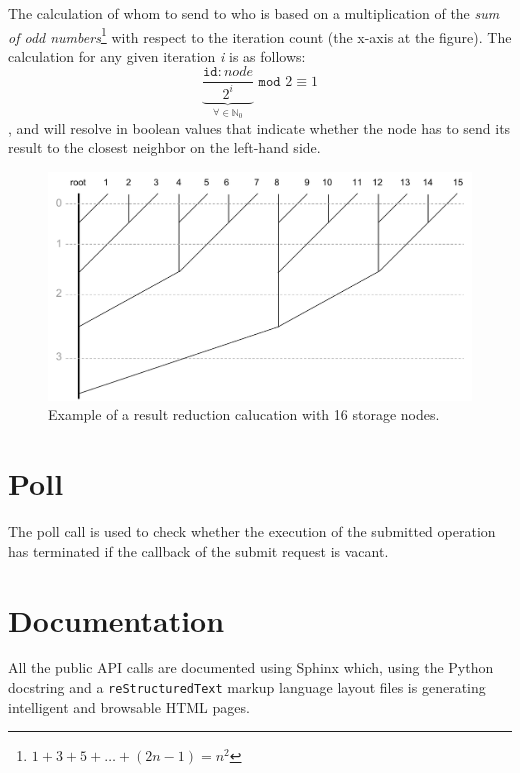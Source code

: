 The calculation of whom to send to who is based on a multiplication of the \textit{sum of odd numbers}\footnote{$1 + 3 + 5 + \ldots + (2n-1) = n^2$} with respect to the iteration count (the x-axis at the figure). The calculation for any given iteration \textit{i} is as follows:
\begin{equation}
\underbrace{\dfrac{\texttt{id}:node}{2^{i}}}_{\forall \in \mathbb{N}_0} \texttt{ mod } 2 \equiv 1
\end{equation}
, and will resolve in boolean values that indicate whether the node has to send its result to the closest neighbor on the left-hand side.

\begin{figure}
	\centering
	\includegraphics[scale=0.5]{pdf/reduction-tree.pdf}
	\caption[Result reduction calucation example]{Example of a result reduction calucation with 16 storage nodes. \label{fig:reduction-tree}}
\end{figure}	

\section{Poll}
The poll call is used to check whether the execution of the submitted operation has terminated if the callback of the submit request is vacant.

\section{Documentation}
All the public API calls are documented using Sphinx \cite{PageSphinx} which, using the Python docstring and a \texttt{reStructuredText} markup language layout files is generating intelligent and browsable HTML pages.
